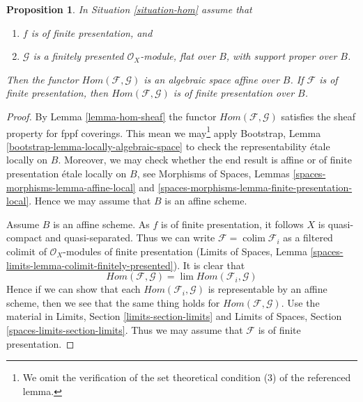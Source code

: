 \documentclass{stacks-project}
\theoremstyle{plain}
\newtheorem{proposition}[subsection]{Proposition}
\theoremstyle{definition}
\theoremstyle{remark}
\numberwithin{equation}{subsection}
\def\lim{\mathop{\mathrm{lim}}\nolimits}
\def\colim{\mathop{\mathrm{colim}}\nolimits}
\begin{document}
\begin{proposition}
\label{proposition-hom}
In Situation \ref{situation-hom} assume that
\begin{enumerate}
\item $f$ is of finite presentation, and
\item $\mathcal{G}$ is a finitely presented $\mathcal{O}_X$-module,
flat over $B$, with support proper over $B$.
\end{enumerate}
Then the functor $\mathit{Hom}(\mathcal{F}, \mathcal{G})$ is
an algebraic space affine over $B$. If $\mathcal{F}$
is of finite presentation, then $\mathit{Hom}(\mathcal{F}, \mathcal{G})$
is of finite presentation over $B$.
\end{proposition}

\begin{proof}
By Lemma \ref{lemma-hom-sheaf} the functor
$\mathit{Hom}(\mathcal{F}, \mathcal{G})$ satisfies
the sheaf property for fppf coverings. This mean we may\footnote{We omit
the verification of the set theoretical condition (3) of the referenced
lemma.} apply
Bootstrap, Lemma \ref{bootstrap-lemma-locally-algebraic-space}
to check the representability \'etale locally on $B$. Moreover,
we may check whether the end result is affine or
of finite presentation \'etale locally on $B$, see
Morphisms of Spaces, Lemmas \ref{spaces-morphisms-lemma-affine-local} and
\ref{spaces-morphisms-lemma-finite-presentation-local}.
Hence we may assume that $B$ is an affine scheme.

\medskip\noindent
Assume $B$ is an affine scheme. As $f$ is of finite presentation, it follows
$X$ is quasi-compact and quasi-separated. Thus we can write
$\mathcal{F} = \colim \mathcal{F}_i$ as a filtered colimit of
$\mathcal{O}_X$-modules of finite presentation
(Limits of Spaces, Lemma \ref{spaces-limits-lemma-colimit-finitely-presented}).
It is clear that
$$
\mathit{Hom}(\mathcal{F}, \mathcal{G}) =
\lim \mathit{Hom}(\mathcal{F}_i, \mathcal{G})
$$
Hence if we can show that each $\mathit{Hom}(\mathcal{F}_i, \mathcal{G})$
is representable by an affine scheme, then we see that the same thing
holds for $\mathit{Hom}(\mathcal{F}, \mathcal{G})$. Use the material in
Limits, Section \ref{limits-section-limits} and
Limits of Spaces, Section \ref{spaces-limits-section-limits}.
Thus we may assume that $\mathcal{F}$ is of finite presentation.


\end{proof}
\end{document}
